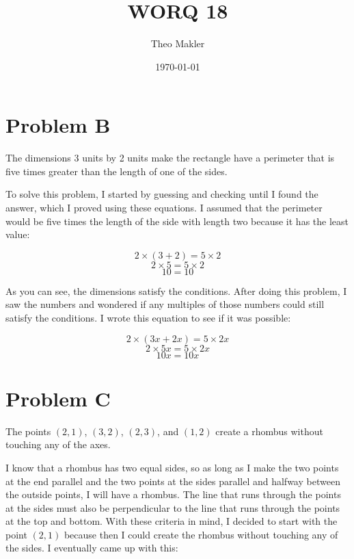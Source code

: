 \documentclass[a4paper]{article}
\title{WORQ 18}
\author{Theo Makler}
\date{\today}
\begin{document}
\maketitle

\section{Problem B}

The dimensions 3 units by 2 units make the rectangle have a perimeter that is five times greater than the length of one of the sides.

To solve this problem, I started by guessing and checking until I found the answer, which I proved using these equations. I assumed that the perimeter would be five times the length of the side with length two because it has the least value:

$$2\times(3+2)=5\times2$$
$$2\times5=5\times2$$
$$10=10$$

As you can see, the dimensions satisfy the conditions. After doing this problem, I saw the numbers and wondered if any multiples of those numbers could still satisfy the conditions. I wrote this equation to see if it was possible:

$$2\times(3x+2x)=5\times2x$$
$$2\times5x=5\times2x$$
$$10x=10x$$

\section{Problem C}

The points $(2,1)$, $(3,2)$, $(2,3)$, and $(1,2)$ create a rhombus without touching any of the axes.

I know that a rhombus has two equal sides, so as long as I make the two points at the end parallel and the two points at the sides parallel and halfway between the outside points, I will have a rhombus. The line that runs through the points at the sides must also be perpendicular to the line that runs through the points at the top and bottom. With these criteria in mind, I decided to start with the point $(2,1)$ because then I could create the rhombus without touching any of the sides. I eventually came up with this:
\end{document}
